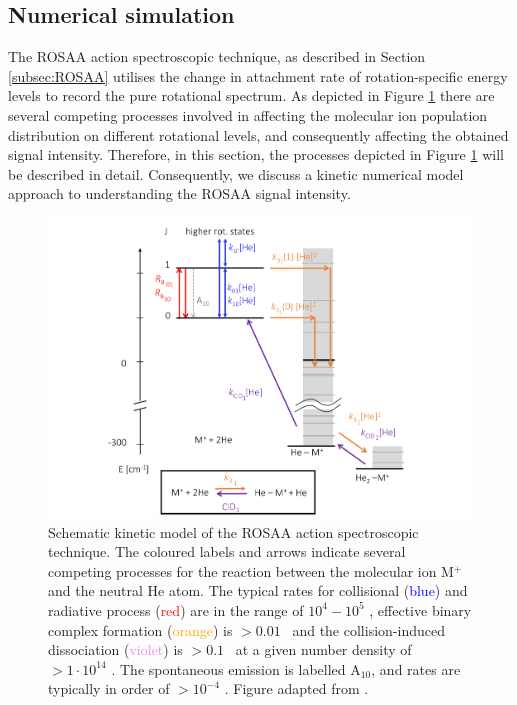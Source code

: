 \subsection{Numerical simulation}
\label{subsec:ROSAA-simulation}

The ROSAA action spectroscopic technique, as described in Section \ref{subsec:ROSAA} utilises the change in attachment rate of rotation-specific energy levels to record the pure rotational spectrum. As depicted in Figure \ref{fig:setup:ROSAA} there are several competing processes involved in affecting the molecular ion population distribution on different rotational levels, and consequently affecting the obtained signal intensity. Therefore, in this section, the processes depicted in Figure \ref{fig:setup:ROSAA} will be described in detail. Consequently, we discuss a kinetic numerical model approach to understanding the ROSAA signal intensity.

\begin{figure}[!htb]
    \centering
    
    \includegraphics[width=1\textwidth]{figures/methods/ROSAA.pdf}
    \caption{Schematic kinetic model of the ROSAA action spectroscopic technique. The coloured labels and arrows indicate several competing processes for the reaction between the molecular ion M$^+$ and the neutral He atom. The typical rates for collisional (\textcolor{blue}{blue}) and radiative process (\textcolor{red}{red}) are in the range of $10^{4} - 10^{5}$ \pers, effective binary complex formation (\textcolor{orange}{orange}) is $> 0.01$ \pers\ and the collision-induced dissociation (\textcolor{violet}{violet}) is $> 0.1$ \pers\ at a given number density of $> 1 \cdot 10^{14}$ \percc. The spontaneous emission is labelled A$_{10}$, and rates are typically in order of $> 10^{-4}$ \pers. Figure adapted from \citet{Brunken2017}.}
    \label{fig:setup:ROSAA}
\end{figure}

